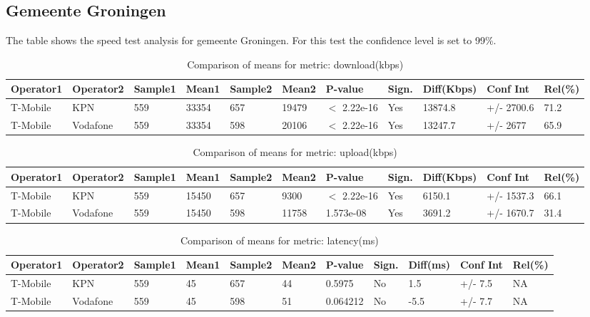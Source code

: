 \documentclass[]{article}
\begin{document}
\normalsize

\newpage

\subsection{Gemeente Groningen}\label{gemeente-groningen}

The table shows the speed test analysis for gemeente Groningen. For this
test the confidence level is set to 99\%.

\begin{table}[ht]
\centering
{\footnotesize
\begin{tabular}{lllllllllll}
  \hline
Operator1 & Operator2 & Sample1 & Mean1 & Sample2 & Mean2 & P-value & Sign. & Diff(Kbps) & Conf Int & Rel(\%) \\ 
  \hline
T-Mobile & KPN & 559 & 33354 & 657 & 19479 & $<$ 2.22e-16 & Yes & 13874.8 & +/- 2700.6 & 71.2 \\ 
  T-Mobile & Vodafone & 559 & 33354 & 598 & 20106 & $<$ 2.22e-16 & Yes & 13247.7 & +/- 2677 & 65.9 \\ 
   \hline
\end{tabular}
}
\caption{Comparison of means for metric: download(kbps)} 
\end{table}

\begin{table}[ht]
\centering
{\footnotesize
\begin{tabular}{lllllllllll}
  \hline
Operator1 & Operator2 & Sample1 & Mean1 & Sample2 & Mean2 & P-value & Sign. & Diff(Kbps) & Conf Int & Rel(\%) \\ 
  \hline
T-Mobile & KPN & 559 & 15450 & 657 & 9300 & $<$ 2.22e-16 & Yes & 6150.1 & +/- 1537.3 & 66.1 \\ 
  T-Mobile & Vodafone & 559 & 15450 & 598 & 11758 & 1.573e-08 & Yes & 3691.2 & +/- 1670.7 & 31.4 \\ 
   \hline
\end{tabular}
}
\caption{Comparison of means for metric: upload(kbps)} 
\end{table}

\begin{table}[ht]
\centering
{\footnotesize
\begin{tabular}{lllllllllll}
  \hline
Operator1 & Operator2 & Sample1 & Mean1 & Sample2 & Mean2 & P-value & Sign. & Diff(ms) & Conf Int & Rel(\%) \\ 
  \hline
T-Mobile & KPN & 559 & 45 & 657 & 44 & 0.5975 & No & 1.5 & +/- 7.5 & NA \\ 
  T-Mobile & Vodafone & 559 & 45 & 598 & 51 & 0.064212 & No & -5.5 & +/- 7.7 & NA \\ 
   \hline
\end{tabular}
}
\caption{Comparison of means for metric: latency(ms)} 
\end{table}
\end{document}
